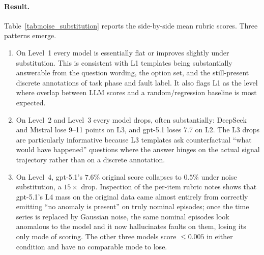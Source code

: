 \documentclass{article}
\begin{document}
\paragraph{Result.} Table~\ref{tab:noise_substitution} reports the side-by-side mean rubric scores. Three patterns emerge.

\begin{enumerate}
    \item On Level~1 every model is essentially flat or improves slightly under substitution. This is consistent with L1 templates being substantially answerable from the question wording, the option set, and the still-present discrete annotations of task phase and fault label. It also flags L1 as the level where overlap between LLM scores and a random/regression baseline is most expected.
    \item On Level~2 and Level~3 every model drops, often substantially: DeepSeek and Mistral lose 9--11 points on L3, and gpt-5.1 loses 7.7 on L2. The L3 drops are particularly informative because L3 templates ask counterfactual ``what would have happened'' questions where the answer hinges on the actual signal trajectory rather than on a discrete annotation.
    \item On Level~4, gpt-5.1's $7.6\%$ original score collapses to $0.5\%$ under noise substitution, a $15{\times}$ drop. Inspection of the per-item rubric notes shows that gpt-5.1's L4 mass on the original data came almost entirely from correctly emitting ``no anomaly is present'' on truly nominal episodes; once the time series is replaced by Gaussian noise, the same nominal episodes look anomalous to the model and it now hallucinates faults on them, losing its only mode of scoring. The other three models score $\leq 0.005$ in either condition and have no comparable mode to lose.
\end{enumerate}
\end{document}

